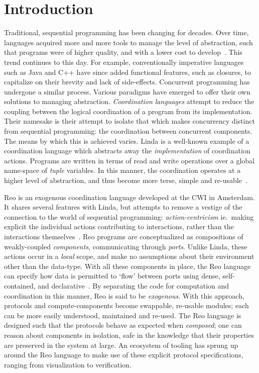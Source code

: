 \chapter{Introduction}	


Traditional, sequential programming has been changing for decades. Over time, languages acquired more and more tools to manage the level of abstraction, such that programs were of higher quality, and with a lower cost to develop~\cite{shaw1984abstraction}. This trend continues to this day. For example, conventionally imperative languages such as Java and C++ have since added functional features, such as closures, to capitalize on their brevity and lack of side-effects. Concurrent programming has undergone a similar process. Various paradigms have emerged to offer their own solutions to managing abstraction. \textit{Coordination languages} attempt to reduce the coupling between the logical coordination of a program from its implementation. Their namesake is their attempt to isolate that which makes concurrency distinct from sequential programming: the coordination between concurrent components. The means by which this is achieved varies. Linda is a well-known example of a coordination language which abstracts away the \textit{implementation} of coordination actions. Programs are written in terms of read and write operations over a global name-space of \textit{tuple} variables. In this manner, the coordination operates at a higher level of abstraction, and thus become more terse, simple and re-usable~\cite{gelernter1985generative}.

Reo is an exogenous coordination language developed at the CWI in Amsterdam. It shares several features with Linda, but attempts to remove a vestige of the connection to the world of sequential programming: \textit{action-centricism} ie.\ making explicit the individual actions contributing to interactions, rather than the interactions themselves~\cite{arbab2011puff}. Reo programs are conceptualized as compositions of weakly-coupled \textit{components}, communicating through \textit{ports}. Unlike Linda, these actions occur in a \textit{local} scope, and make no assumptions about their environment other than the data-type. With all these components in place, the Reo language can specify how data is permitted to `flow' between ports using dense, self-contained, and declarative~\cite{arbab2004reo}. By separating the code for computation and coordination in this manner, Reo is said to be \textit{exogenous}. With this approach, protocols and compute-components become swappable, re-usable modules; each can be more easily understood, maintained and re-used. The Reo language is designed such that the protocols behave as expected when \textit{composed}; one can reason about components in isolation, safe in the knowledge that their properties are preserved in the system at large. An ecosystem of tooling has sprung up around the Reo language to make use of these explicit protocol specifications, ranging from visualization to verification. 

